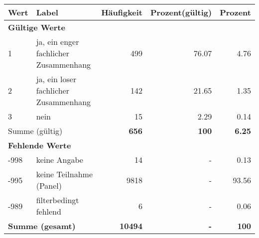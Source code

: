      \begin{longtable}{lXrrr}
     \toprule
     \textbf{Wert} & \textbf{Label} & \textbf{Häufigkeit} & \textbf{Prozent(gültig)} & \textbf{Prozent} \\
     \endhead
     \midrule
     \multicolumn{5}{l}{\textbf{Gültige Werte}}\\

     1 &
     \multicolumn{1}{X}{ ja, ein enger fachlicher Zusammenhang   } &


       \num{499} &
       \num[round-mode=places,round-precision=2]{76.07} &
         \num[round-mode=places,round-precision=2]{4.76} \\

     2 &
     \multicolumn{1}{X}{ ja, ein loser fachlicher Zusammenhang   } &


       \num{142} &
       \num[round-mode=places,round-precision=2]{21.65} &
         \num[round-mode=places,round-precision=2]{1.35} \\

     3 &
     \multicolumn{1}{X}{ nein   } &


       \num{15} &
       \num[round-mode=places,round-precision=2]{2.29} &
         \num[round-mode=places,round-precision=2]{0.14} \\
     \midrule
     \multicolumn{2}{l}{Summe (gültig)} &
       \textbf{\num{656}} &
     \textbf{\num{100}} &
       \textbf{\num[round-mode=places,round-precision=2]{6.25}} \\
     \multicolumn{5}{l}{\textbf{Fehlende Werte}}\\
       -998 &
       keine Angabe &
         \num{14} &
        - &
         \num[round-mode=places,round-precision=2]{0.13} \\
       -995 &
       keine Teilnahme (Panel) &
         \num{9818} &
        - &
         \num[round-mode=places,round-precision=2]{93.56} \\
       -989 &
       filterbedingt fehlend &
         \num{6} &
        - &
         \num[round-mode=places,round-precision=2]{0.06} \\
     \midrule
     \multicolumn{2}{l}{\textbf{Summe (gesamt)}} &
          \textbf{\num{10494}} &
        \textbf{-} &
        \textbf{\num{100}} \\
     \bottomrule
     \end{longtable}
     
